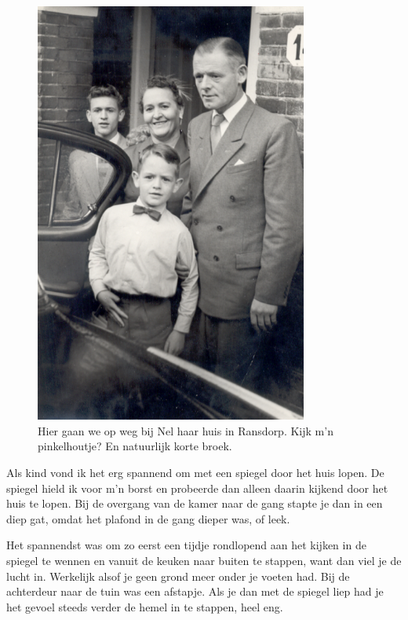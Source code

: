 \documentclass[12pt,twoside, openright]{memoir}
\begin{document}
\begin{figure}
\centering
\includegraphics[width=0.8\textwidth]{img/ch5/trouwengn}
\caption*{\footnotesize Hier gaan we op weg bij Nel haar huis in Ransdorp. Kijk m’n pinkelhoutje? En natuurlijk korte broek.}
\end{figure}

Als kind vond ik het erg spannend om met een spiegel door het huis lopen. De spiegel hield ik voor m’n borst en probeerde dan alleen daarin kijkend door het huis te lopen. Bij de overgang van de kamer naar de gang stapte je dan in een diep gat, omdat het plafond in de gang dieper was, of leek. 

Het spannendst was om zo eerst een tijdje rondlopend aan het kijken in de spiegel te wennen en vanuit de keuken naar buiten te stappen, want dan viel je de lucht in. Werkelijk alsof je geen grond meer onder je voeten had. Bij de achterdeur naar de tuin was een afstapje. Als je dan met de spiegel liep had je het gevoel steeds verder de hemel in te stappen, heel eng. 
\end{document}
